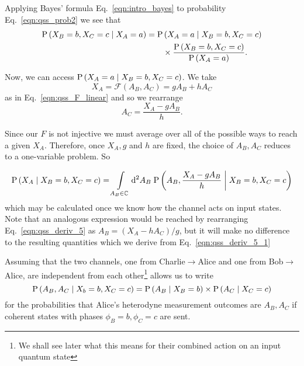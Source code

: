 Applying Bayes' formula Eq.~\ref{eqn:intro_bayes} to probability Eq.~\ref{eqn:qss_prob2} we see that
\begin{align}
\text{P}\left(X_B=b, X_C=c \; \middle| \; X_A=a\right) = \text{P}&\left(X_A=a \; \middle| \; X_B=b, X_C=c\right) \notag \\
&\times \frac{\text{P}\left(X_B=b, X_C=c\right)}{\text{P}\left(X_A=a\right)}.
\end{align}


\noindent Now, we can access $\text{P}\left(X_A=a \; \middle| \; X_B=b, X_C=c\right)$. 
We take
\begin{equation}\label{eqn:qss_deriv_5}
X_A = \mathcal{F}\left(A_B, A_C\right) = g A_B + h A_C
\end{equation}
as in Eq.~\ref{eqn:qss_F_linear} and so we rearrange
\begin{equation}
A_C = \frac{X_A - g A_B}{h}.
\end{equation}

\noindent Since our $F$ is not injective %
we must average over all of the possible ways to reach a given $X_A$. Therefore, once $X_A, g$ and $h$ are fixed, the choice of $A_B, A_C$ reduces to a one-variable problem. So

\begin{equation}\label{eqn:qss_deriv_5_1}
\text{P}\left(X_A \; \middle| \; X_B=b, X_C=c\right) = \int\limits_{A_B \in \mathbb{C}} \mathop{}\!\mathrm{d^2} A_B \; \text{P}\left(A_B , \frac{X_A - g A_B}{h} \; \middle| \; X_B=b, X_C=c\right)
\end{equation}
which may be calculated once we know how the channel acts on input states. Note that an analogous expression would be reached by rearranging Eq.~\ref{eqn:qss_deriv_5} as $A_B = \left(X_A - h A_C\right)/g$, but it will make no difference to the resulting quantities which we derive from Eq.~\ref{eqn:qss_deriv_5_1}

Assuming that the two channels, one from Charlie$\rightarrow$Alice and one from Bob$\rightarrow$Alice, are independent from each other\footnote{We shall see later what this means for their combined action on an input quantum state} allows us to write
\begin{equation}\label{eqn:qss_deriv_6}
\text{P}\left(A_B, A_C \; \middle| \; X_b=b, X_C=c\right) = \text{P}\left(A_B \; \middle| \; X_B=b\right) \times \text{P}\left(A_C \; \middle| \; X_C=c\right)
\end{equation}
for the probabilities that Alice's heterodyne measurement outcomes are $A_B, A_C$ if coherent states with phases $\phi_B = b, \phi_C = c$ are sent.

